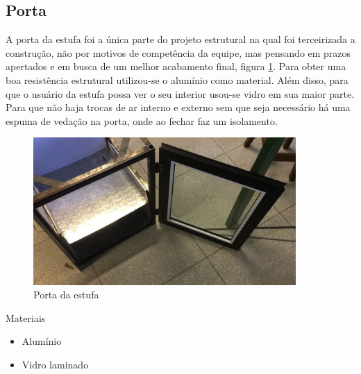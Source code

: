 \subsection{Porta}

A porta da estufa foi a única parte do projeto estrutural na qual foi terceirizada a construção, não por motivos de competência da equipe, mas pensando em prazos apertados e em busca de um melhor acabamento final, figura \ref{fig:porta}. Para obter uma boa resistência estrutural utilizou-se o alumínio como material. Além disso, para que o usuário da estufa possa ver o seu interior usou-se vidro em sua maior parte. Para que não haja trocas de ar interno e externo sem que seja necessário há uma espuma de vedação na porta, onde ao fechar faz um isolamento.

\begin{figure}[H]
	\centering
	\includegraphics[width=10cm]{figuras/porta.png}
	\caption{Porta da estufa}
	\label{fig:porta}
\end{figure}

Materiais

\begin{itemize}
	
	\item Alumínio
	\item Vidro laminado
\end{itemize}

